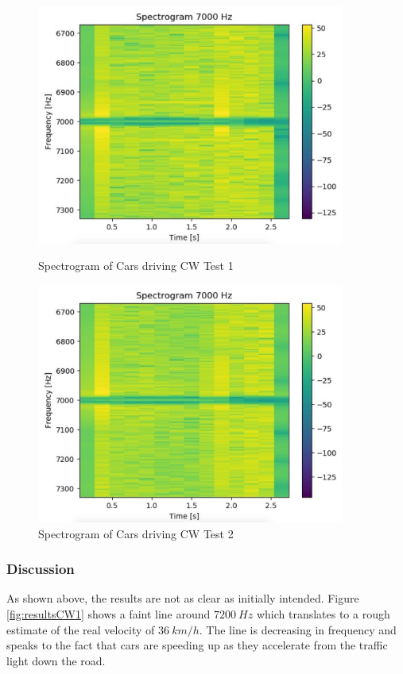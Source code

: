 \begin{figure}[h!]
    \centering
    \begin{minipage}{0.45\textwidth}
        \centering
        \includegraphics[width = 0.9\textwidth]{images/resultsCW1.pdf}
        \caption{Spectrogram of Cars driving CW Test 1}\label{fig:resultsCW1}
    \end{minipage}\hfill
    \begin{minipage}{0.45\textwidth}
        \centering
        \includegraphics[width=0.9\textwidth]{images/resultsCW2.pdf}
        \caption{Spectrogram of Cars driving CW Test 2}\label{fig:resultsCW2}
    \end{minipage}
\end{figure}

\subsubsection{Discussion}
As shown above, the results are not as clear as initially intended. Figure \ref{fig:resultsCW1} shows a faint line around $7200\ Hz$ which translates to a rough estimate of the real velocity of $36\ km/h$. The line is decreasing in frequency and speaks to the fact that cars are speeding up as they accelerate from the traffic light down the road.

